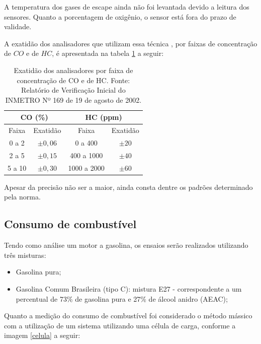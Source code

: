 A temperatura dos gases de escape ainda não foi levantada devido a leitura dos sensores. Quanto a porcentagem de oxigênio, o sensor está fora do prazo de validade.

A exatidão dos analisadores que utilizam essa técnica , por faixas de concentração de $CO$ e de $HC$, é apresentada na tabela \ref{exatidao} a seguir:

\begin{table}[]
	\centering
	\caption{Exatidão dos analisadores por faixa de concentração de CO e de HC. Fonte: Relatório de Verificação Inicial do INMETRO Nº 169 de 19 de agosto de 2002.}
	\label{exatidao}
	\begin{tabular}{|c|c|c|c|}
		\hline
		\multicolumn{2}{|c|}{CO (\%)} & \multicolumn{2}{c|}{HC (ppm)} \\ \hline
		Faixa        & Exatidão       & Faixa           & Exatidão    \\ \hline
		0 a 2        & $\pm 0,06$       & 0 a 400         & $\pm 20$      \\ \hline
		2 a 5        & $\pm 0,15$       & 400 a 1000      & $\pm 40$      \\ \hline
		5 a 10       & $\pm 0,30$       & 1000 a 2000     & $\pm 60$      \\ \hline
	\end{tabular}
\end{table}

Apesar da precisão não ser a maior, ainda consta dentre os padrões determinado pela norma.

\subsection{Consumo de combustível}

Tendo como análise um motor a gasolina, os ensaios serão realizados utilizando três misturas:

\begin{itemize}
\item Gasolina pura;
\item Gasolina Comum Brasileira (tipo C): mistura E27 - correspondente a um percentual de 73\% de gasolina pura e 27\% de álcool anidro (AEAC);
\end{itemize}

Quanto a medição do consumo de combustível foi considerado o método mássico com a utilização de um sistema utilizando uma célula de carga, conforme a imagem \ref{celula} a seguir:


